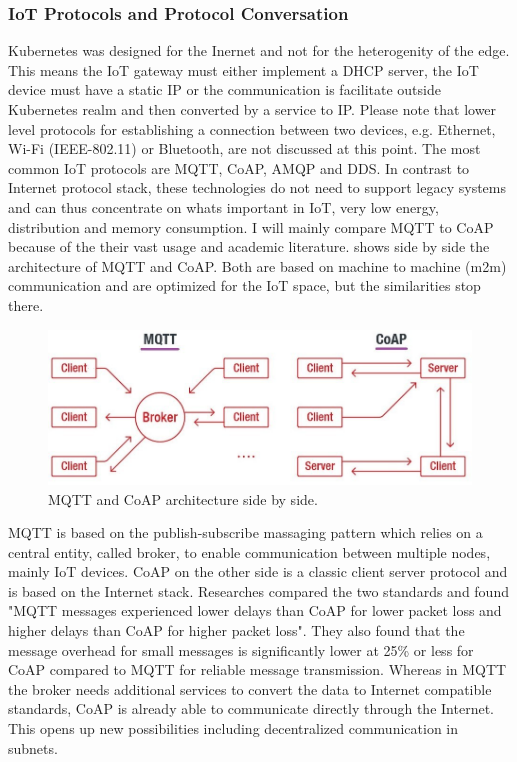 \subsubsection{IoT Protocols and Protocol Conversation}
Kubernetes was designed for the Inernet and not for the heterogenity of the edge. This means the IoT gateway must either implement a DHCP server, the IoT device must have a static IP or the communication is facilitate outside Kubernetes realm and then converted by a service to IP. Please note that lower level protocols for establishing a connection between two devices, e.g. Ethernet, Wi-Fi (IEEE-802.11) or Bluetooth, are not discussed at this point. The most common IoT protocols are MQTT, CoAP, AMQP and DDS. In contrast to Internet protocol stack, these technologies do not need to support legacy systems and can thus concentrate on whats important in IoT, very low energy, distribution and memory consumption. I will mainly compare MQTT to CoAP because of the their vast usage and academic literature.  shows side by side the architecture of MQTT and CoAP. Both are based on machine to machine (m2m) communication and are optimized for the IoT space, but the similarities stop there.
\begin{figure}[h!]
    \centering
    \includegraphics[scale=0.45]{figures/mqtt-vs-coap.jpg}
    \caption{MQTT and CoAP architecture side by side\cite{COAPvsMQTT27:online}.}
    \label{fig:mqttVsCoap}
\end{figure}
MQTT is based on the publish-subscribe massaging pattern which relies on a central entity, called broker, to enable communication between multiple nodes, mainly IoT devices. CoAP on the other side is a classic client server protocol and is based on the Internet stack. Researches compared the two standards and found "MQTT messages experienced lower delays than CoAP for lower packet loss and higher delays than CoAP for higher packet loss"\cite{MQTTvsCoAPAnalysisIEEE}. They also found that the message overhead for small messages is significantly lower at 25\% or less for CoAP compared to MQTT for reliable message transmission. Whereas in MQTT the broker needs additional services to convert the data to Internet compatible standards, CoAP is already able to communicate directly through the Internet. This opens up new possibilities including decentralized communication in subnets.\\
